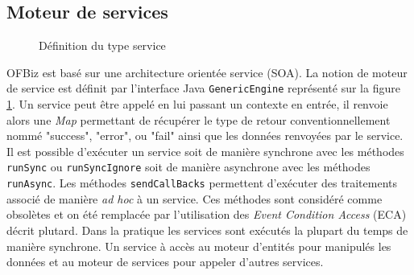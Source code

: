 \documentclass[a4paper, 11pt]{report}
\begin{document}
\subsection{Moteur de services}

\begin{figure}
  \centering
  \caption{Définition du type service}
  \label{fig:serviceengine}
\end{figure}

OFBiz est basé sur une architecture orientée service (SOA).  La notion
de moteur de service est définit par l'interface Java
\verb=GenericEngine= représenté sur la figure \ref{fig:serviceengine}.
Un service peut être appelé en lui passant un contexte en entrée, il
renvoie alors une \emph{Map} permettant de récupérer le type de retour
conventionnellement nommé "success", "error", ou "fail" ainsi que les
données renvoyées par le service.  Il est possible d'exécuter un
service soit de manière synchrone avec les méthodes \verb=runSync= ou
\verb=runSyncIgnore= soit de manière asynchrone avec les méthodes
\verb=runAsync=.  Les méthodes \verb=sendCallBacks= permettent
d'exécuter des traitements associé de manière \emph{ad hoc} à un
service. Ces méthodes sont considéré comme obsolètes et on été
remplacée par l'utilisation des \emph{Event Condition Access} (ECA)
décrit plutard. Dans la pratique les services sont exécutés la plupart
du temps de manière synchrone.  Un service à accès au moteur d'entités
pour manipulés les données et au moteur de services pour appeler
d'autres services.
\end{document}
